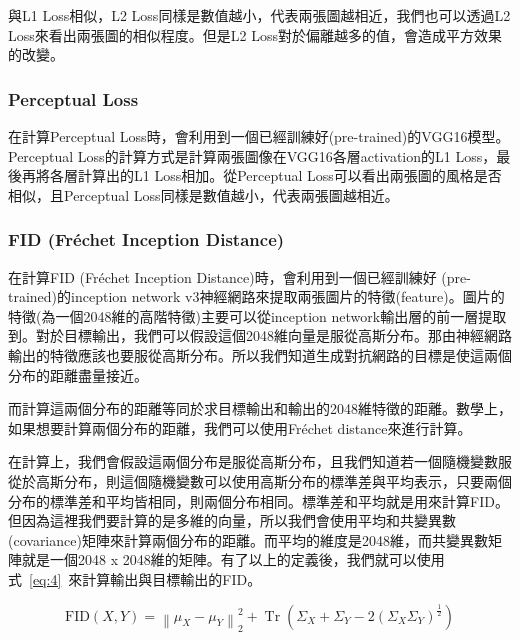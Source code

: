 \documentclass[a4paper, 12pt]{article}
\begin{document}
與L1 Loss相似，L2 Loss同樣是數值越小，代表兩張圖越相近，我們也可以透過L2 Loss來看出兩張圖的相似程度。但是L2 Loss對於偏離越多的值，會造成平方效果的改變。

\subsubsection{Perceptual Loss}

在計算Perceptual Loss\cite{zhang2018perceptual}時，會利用到一個已經訓練好(pre-trained)的VGG16模型。Perceptual Loss的計算方式是計算兩張圖像在VGG16各層activation的L1 Loss，最後再將各層計算出的L1 Loss相加。從Perceptual Loss可以看出兩張圖的風格是否相似，且Perceptual Loss同樣是數值越小，代表兩張圖越相近。

\subsubsection{FID (Fréchet Inception Distance)}
在計算FID (Fréchet Inception Distance)\cite{DOWSON1982450}時，會利用到一個已經訓練好 (pre-trained)的inception network v3神經網路來提取兩張圖片的特徵(feature)。圖片的特徵(為一個2048維的高階特徵)主要可以從inception network輸出層的前一層提取到。對於目標輸出，我們可以假設這個2048維向量是服從高斯分布。那由神經網路輸出的特徵應該也要服從高斯分布。所以我們知道生成對抗網路的目標是使這兩個分布的距離盡量接近。

而計算這兩個分布的距離等同於求目標輸出和輸出的2048維特徵的距離。數學上，如果想要計算兩個分布的距離，我們可以使用Fréchet distance來進行計算。

在計算上，我們會假設這兩個分布是服從高斯分布，且我們知道若一個隨機變數服從於高斯分布，則這個隨機變數可以使用高斯分布的標準差與平均表示，只要兩個分布的標準差和平均皆相同，則兩個分布相同。標準差和平均就是用來計算FID。但因為這裡我們要計算的是多維的向量，所以我們會使用平均和共變異數(covariance)矩陣來計算兩個分布的距離。而平均的維度是2048維，而共變異數矩陣就是一個2048 x 2048維的矩陣。有了以上的定義後，我們就可以使用式~\ref{eq:4}~來計算輸出與目標輸出的FID。


\begin{equation}
    \mathrm{FID}(X, Y)=\left\|\mu_{X}-\mu_{Y}\right\|_{2}^{2}+\operatorname{Tr}\left(\Sigma_{X}+\Sigma_{Y}-2\left(\Sigma_{X} \Sigma_{Y}\right)^{\frac{1}{2}}\right)
    \label{eq:4}
\end{equation}
\end{document}

